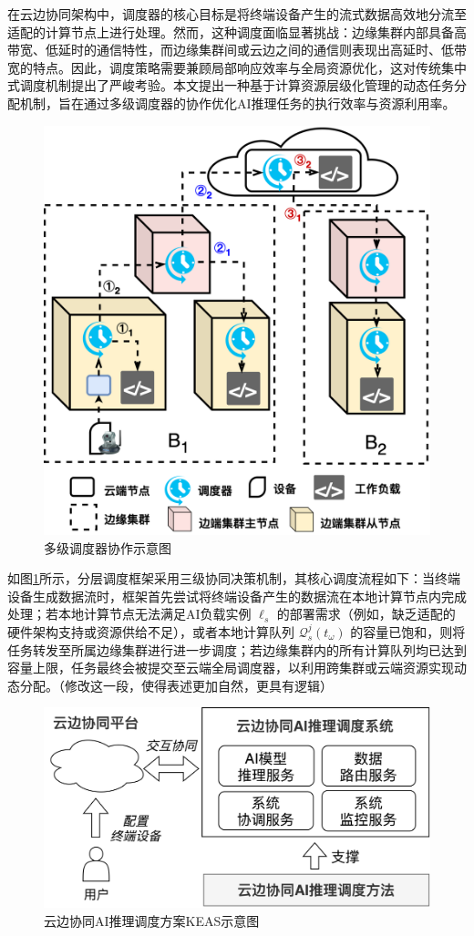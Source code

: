 在云边协同架构中，调度器的核心目标是将终端设备产生的流式数据高效地分流至适配的计算节点上进行处理。然而，这种调度面临显著挑战：边缘集群内部具备高带宽、低延时的通信特性，而边缘集群间或云边之间的通信则表现出高延时、低带宽的特点。因此，调度策略需要兼顾局部响应效率与全局资源优化，这对传统集中式调度机制提出了严峻考验。本文提出一种基于计算资源层级化管理的动态任务分配机制，旨在通过多级调度器的协作优化AI推理任务的执行效率与资源利用率。

\begin{figure}[h]
  \centering
  \includegraphics[width=0.6\linewidth]{pics/3-6调度器.png}
  \caption{多级调度器协作示意图}
  \label{fig:3-6scheduler}
\end{figure}

如图\ref{fig:3-6scheduler}所示，分层调度框架采用三级协同决策机制，其核心调度流程如下：当终端设备生成数据流时，框架首先尝试将终端设备产生的数据流在本地计算节点内完成处理；若本地计算节点无法满足AI负载实例 $\ell_s$ 的部署需求（例如，缺乏适配的硬件架构支持或资源供给不足），或者本地计算队列 $\mathcal{Q}_s^j(t_\omega)$ 的容量已饱和，则将任务转发至所属边缘集群进行进一步调度；若边缘集群内的所有计算队列均已达到容量上限，任务最终会被提交至云端全局调度器，以利用跨集群或云端资源实现动态分配。（修改这一段，使得表述更加自然，更具有逻辑）



\begin{figure}[h]
  \centering
  \includegraphics[width=0.7\linewidth]{pics/3-all.png}
  \caption{云边协同AI推理调度方案KEAS示意图}
  \label{fig:3-all}
\end{figure}

